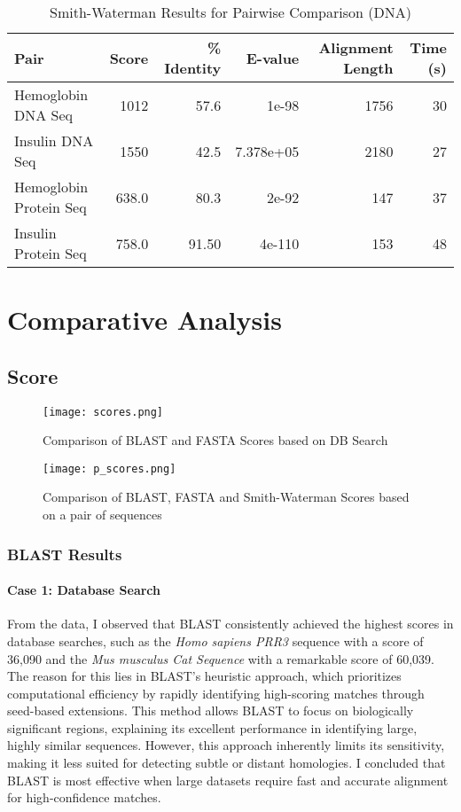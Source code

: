 \documentclass{article}
\begin{document}
\begin{table}[h]
\centering
\caption{Smith-Waterman Results for Pairwise Comparison (DNA)}
\begin{tabular}{@{}lrrrrr@{}}
\toprule
Pair & Score & \% Identity & E-value & Alignment Length & Time (s) \\
\midrule
Hemoglobin DNA Seq & 1012 & 57.6 & 1e-98 & 1756 & 30 \\
Insulin DNA Seq & 1550 & 42.5 & 7.378e+05 & 2180 & 27 \\
Hemoglobin Protein Seq & 638.0 & 80.3 & 2e-92 & 147 & 37 \\
Insulin Protein Seq & 758.0 & 91.50 & 4e-110 & 153 & 48 \\
\bottomrule
\end{tabular}
\end{table}

\section{Comparative Analysis}
\subsection{Score}

\begin{figure}[H]
  \centering
  \texttt{[image: scores.png]}
  \caption{Comparison of BLAST and FASTA Scores based on DB Search}
  \label{fig:db_scores}
\end{figure}

\begin{figure}[H]
  \centering
  \texttt{[image: p\_scores.png]}
  \caption{Comparison of BLAST, FASTA and Smith-Waterman Scores based on a pair of sequences}
  \label{fig:pairwise_scores}
\end{figure}

\subsubsection{ BLAST Results}

\paragraph{Case 1: Database Search}
From the data, I observed that BLAST consistently achieved the highest scores in database searches, such as the \textit{Homo sapiens PRR3} sequence with a score of 36,090 and the \textit{Mus musculus Cat Sequence} with a remarkable score of 60,039. The reason for this lies in BLAST’s heuristic approach, which prioritizes computational efficiency by rapidly identifying high-scoring matches through seed-based extensions. This method allows BLAST to focus on biologically significant regions, explaining its excellent performance in identifying large, highly similar sequences. However, this approach inherently limits its sensitivity, making it less suited for detecting subtle or distant homologies. I concluded that BLAST is most effective when large datasets require fast and accurate alignment for high-confidence matches.
\end{document}
